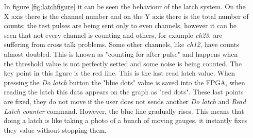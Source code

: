 \noindent In figure \ref{fig:latchfigure} it can be seen the behaviour of the latch system. On the X axis there is the channel number and on the Y axis there is the total number of counts; the test pulses are being sent only to even channels, however it can be seen that not every channel is counting and others, for example \textit{ch23}, are suffering from cross talk problems. Some other channels, like \textit{ch12}, have counts almost doubled. This is known as "counting for after pulse" and happens when the threshold value is not perfectly setted and some noise is being counted.
The key point in this figure is the red line. This is the last read latch value.
When pressing the \textit{Do latch} button the "blue dots" value is saved into the FPGA, when reading the latch this data appears on the graph as "red dots".
These last points are fixed, they do not move if the user does not sends another \textit{Do latch} and \textit{Read Latch counter} command. However, the blue line gradually rises.
This means that doing a latch is like taking a photo of a bunch of moving gauges, it instantly fixes they value without stopping them.  

